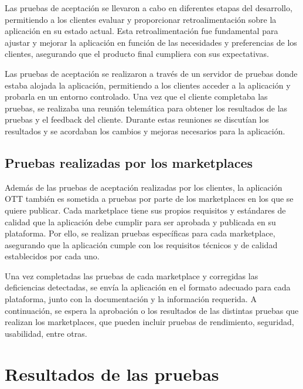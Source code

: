 Las pruebas de aceptación se llevaron a cabo en diferentes etapas del desarrollo, permitiendo a los clientes evaluar y
proporcionar retroalimentación sobre la aplicación en su estado actual. Esta retroalimentación fue fundamental para
ajustar y mejorar la aplicación en función de las necesidades y preferencias de los clientes, asegurando que el producto
final cumpliera con sus expectativas. 

Las pruebas de aceptación se realizaron a través de un servidor de pruebas donde estaba alojada la aplicación, permitiendo
a los clientes acceder a la aplicación y probarla en un entorno controlado. Una vez que el cliente completaba las pruebas, se
realizaba una reunión telemática para obtener los resultados de las pruebas y el feedback del cliente. Durante estas reuniones
se discutían los resultados y se acordaban los cambios y mejoras necesarios para la aplicación.

\subsection{Pruebas realizadas por los marketplaces}
\label{subsec:pruebas_marketplaces}

Además de las pruebas de aceptación realizadas por los clientes, la aplicación OTT también es sometida a pruebas por parte
de los marketplaces en los que se quiere publicar. Cada marketplace tiene sus propios requisitos y estándares de calidad que la
aplicación debe cumplir para ser aprobada y publicada en su plataforma. Por ello, se realizan pruebas específicas para
cada marketplace, asegurando que la aplicación cumple con los requisitos técnicos y de calidad establecidos por cada uno.

Una vez completadas las pruebas de cada marketplace y corregidas las deficiencias detectadas, se envía la aplicación en el formato
adecuado para cada plataforma, junto con la documentación y la información requerida. A continuación, se espera la aprobación o los 
resultados de las distintas pruebas que realizan los marketplaces, que pueden incluir pruebas de rendimiento, seguridad, usabilidad,
entre otras.

\section{Resultados de las pruebas}
\label{sec:resultados_pruebas}

